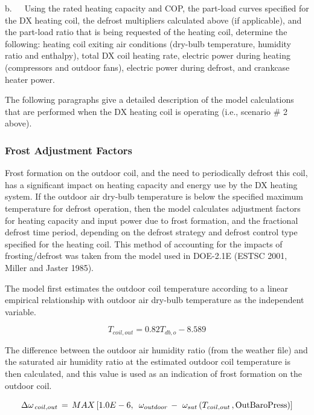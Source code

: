 b.~~~Using the rated heating capacity and COP, the part-load curves specified for the DX heating coil, the defrost multipliers calculated above (if applicable), and the part-load ratio that is being requested of the heating coil, determine the following: heating coil exiting air conditions (dry-bulb temperature, humidity ratio and enthalpy), total DX coil heating rate, electric power during heating (compressors and outdoor fans), electric power during defrost, and crankcase heater power.

The following paragraphs give a detailed description of the model calculations that are performed when the DX heating coil is operating (i.e., scenario \# 2 above).

\subsubsection{Frost Adjustment Factors}\label{frost-adjustment-factors}

Frost formation on the outdoor coil, and the need to periodically defrost this coil, has a significant impact on heating capacity and energy use by the DX heating system. If the outdoor air dry-bulb temperature is below the specified maximum temperature for defrost operation, then the model calculates adjustment factors for heating capacity and input power due to frost formation, and the fractional defrost time period, depending on the defrost strategy and defrost control type specified for the heating coil. This method of accounting for the impacts of frosting/defrost was taken from the model used in DOE-2.1E (ESTSC 2001, Miller and Jaster 1985).

The model first estimates the outdoor coil temperature according to a linear empirical relationship with outdoor air dry-bulb temperature as the independent variable.

\begin{equation}
{T_{coil,out}} = 0.82{T_{db,o}} - 8.589
\end{equation}

The difference between the outdoor air humidity ratio (from the weather file) and the saturated air humidity ratio at the estimated outdoor coil temperature is then calculated, and this value is used as an indication of frost formation on the outdoor coil.

\begin{equation}
\Delta {\omega_{\,coil,out}}\, = \,MAX\left[ {1.0E - 6,\,\,\,{\omega_{outdoor}}\, - \,\,{\omega_{sat}}\left( {{T_{coil,out}}\,,{\rm{OutBaroPress}}} \right)} \right]
\end{equation}

